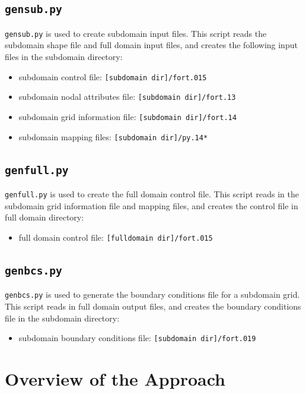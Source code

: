 \documentclass[11pt,titlepage]{article}
\begin{document}
\subsection{\texttt{gensub.py}}

\verb+gensub.py+ is used to create subdomain input files. This script
reads the subdomain shape file and full domain input files, and creates
the following input files in the subdomain directory:

\begin{itemize}
\item subdomain control file: \verb+[subdomain dir]/fort.015+ 
\item subdomain nodal attributes file: \verb+[subdomain dir]/fort.13+
\item subdomain grid information file: \verb+[subdomain dir]/fort.14+
\item subdomain mapping files: \verb+[subdomain dir]/py.14*+
\end{itemize}

\subsection{\texttt{genfull.py}}

\verb+genfull.py+ is used to create the full domain control file. This
script reads in the subdomain grid information file and mapping files,
and creates the control file in full domain directory:

\begin{itemize}
\item full domain control file: \verb+[fulldomain dir]/fort.015+ 
\end{itemize}

\subsection{\texttt{genbcs.py}}

\verb+genbcs.py+ is used to generate the boundary conditions file for
a subdomain grid. This script reads in full domain output files, and
creates the boundary conditions file in the subdomain directory:

\begin{itemize}
\item subdomain boundary conditions file: \verb+[subdomain dir]/fort.019+
\end{itemize}

\section{Overview of the Approach}
\end{document}
